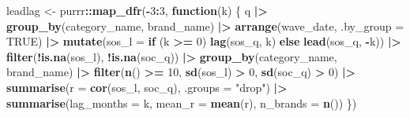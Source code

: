 \documentclass[
]{article}
\newenvironment{Shaded}{\begin{snugshade}}{\end{snugshade}}
\newcommand{\AttributeTok}[1]{\textcolor[rgb]{0.13,0.29,0.53}{#1}}
\newcommand{\ConstantTok}[1]{\textcolor[rgb]{0.56,0.35,0.01}{#1}}
\newcommand{\ControlFlowTok}[1]{\textcolor[rgb]{0.13,0.29,0.53}{\textbf{#1}}}
\newcommand{\DecValTok}[1]{\textcolor[rgb]{0.00,0.00,0.81}{#1}}
\newcommand{\FunctionTok}[1]{\textcolor[rgb]{0.13,0.29,0.53}{\textbf{#1}}}
\newcommand{\NormalTok}[1]{#1}
\newcommand{\OtherTok}[1]{\textcolor[rgb]{0.56,0.35,0.01}{#1}}
\newcommand{\SpecialCharTok}[1]{\textcolor[rgb]{0.81,0.36,0.00}{\textbf{#1}}}
\newcommand{\StringTok}[1]{\textcolor[rgb]{0.31,0.60,0.02}{#1}}
\begin{document}
\begin{Shaded}
\begin{Highlighting}[]
\NormalTok{leadlag }\OtherTok{\textless{}{-}}\NormalTok{ purrr}\SpecialCharTok{::}\FunctionTok{map\_dfr}\NormalTok{(}\SpecialCharTok{{-}}\DecValTok{3}\SpecialCharTok{:}\DecValTok{3}\NormalTok{, }\ControlFlowTok{function}\NormalTok{(k) \{}
\NormalTok{  q }\SpecialCharTok{|\textgreater{}}
    \FunctionTok{group\_by}\NormalTok{(category\_name, brand\_name) }\SpecialCharTok{|\textgreater{}}
    \FunctionTok{arrange}\NormalTok{(wave\_date, }\AttributeTok{.by\_group =} \ConstantTok{TRUE}\NormalTok{) }\SpecialCharTok{|\textgreater{}}
    \FunctionTok{mutate}\NormalTok{(}\AttributeTok{sos\_l =} \ControlFlowTok{if}\NormalTok{ (k }\SpecialCharTok{\textgreater{}=} \DecValTok{0}\NormalTok{) }\FunctionTok{lag}\NormalTok{(sos\_q, k) }\ControlFlowTok{else} \FunctionTok{lead}\NormalTok{(sos\_q, }\SpecialCharTok{{-}}\NormalTok{k)) }\SpecialCharTok{|\textgreater{}}
    \FunctionTok{filter}\NormalTok{(}\SpecialCharTok{!}\FunctionTok{is.na}\NormalTok{(sos\_l), }\SpecialCharTok{!}\FunctionTok{is.na}\NormalTok{(soc\_q)) }\SpecialCharTok{|\textgreater{}}
    \FunctionTok{group\_by}\NormalTok{(category\_name, brand\_name) }\SpecialCharTok{|\textgreater{}}
    \FunctionTok{filter}\NormalTok{(}\FunctionTok{n}\NormalTok{() }\SpecialCharTok{\textgreater{}=} \DecValTok{10}\NormalTok{, }\FunctionTok{sd}\NormalTok{(sos\_l) }\SpecialCharTok{\textgreater{}} \DecValTok{0}\NormalTok{, }\FunctionTok{sd}\NormalTok{(soc\_q) }\SpecialCharTok{\textgreater{}} \DecValTok{0}\NormalTok{) }\SpecialCharTok{|\textgreater{}}
    \FunctionTok{summarise}\NormalTok{(}\AttributeTok{r =} \FunctionTok{cor}\NormalTok{(sos\_l, soc\_q), }\AttributeTok{.groups =} \StringTok{"drop"}\NormalTok{) }\SpecialCharTok{|\textgreater{}}
    \FunctionTok{summarise}\NormalTok{(}\AttributeTok{lag\_months =}\NormalTok{ k, }\AttributeTok{mean\_r =} \FunctionTok{mean}\NormalTok{(r), }\AttributeTok{n\_brands =} \FunctionTok{n}\NormalTok{())}
\NormalTok{\})}


\end{Highlighting}
\end{Shaded}
\end{document}
